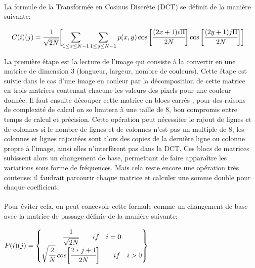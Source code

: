 \documentclass[12pt]{article}
\begin{document}
\paragraph{}
La formule de la Transformée en Cosinus Discrète (DCT) se définit de la manière suivante: 

\begin{equation*} 
C(i)(j)=\cfrac{1}{\sqrt{2N}} \biggl[\sum_{1\leq x\leq N-1} \sum_{1\leq y\leq N-1} p(x,y) \cos{\biggl[\cfrac{(2x+1) i \Pi}{2N}}\biggr] \cos{\biggl[\cfrac{(2y+1) j \Pi}{2N}}\biggr]\biggr]
\end{equation*}

La première étape est la lecture de l’image qui consiste à la convertir en une matrice de dimension 3 (longueur, largeur, nombre de couleurs). Cette étape est suivie dans le cas d’une image en couleur par la décomposition de cette matrice en trois matrices contenant chacune les valeurs des pixels pour une couleur donnée. Il faut ensuite découper cette matrice en blocs carrés , pour des raisons de complexité de calcul on se limitera à une taille de 8, bon compromis entre temps de calcul et précision. Cette opération peut nécessiter le rajout de lignes et de colonnes si le nombre de lignes et de colonnes n’est pas un multiple de 8, les colonnes et lignes rajoutées sont alors des copies de la dernière ligne ou colonne propre à l’image, ainsi elles n’interfèrent pas dans la DCT. Ces blocs de matrices subissent alors un changement de base, permettant de faire apparaître les variations sous forme de fréquences. Mais cela reste encore une opération très couteuse: il faudrait parcourir chaque matrice et calculer une somme double pour chaque coefficient.
\paragraph{}

\paragraph{}
Pour éviter cela, on peut concevoir cette formule comme un changement de base avec la matrice de passage définie de la manière suivante:
\begin{center}
$P(i)(j)=
\begin{Bmatrix}
\cfrac{1}{\sqrt{2N}}  \qquad if \quad i=0 \\
\sqrt{\cfrac{2}{N}} \: cos\biggl[\cfrac{2*j+1}{2N}\biggr] \qquad if \quad i>0 \\
\end{Bmatrix}
$
\end{center}
\end{document}
